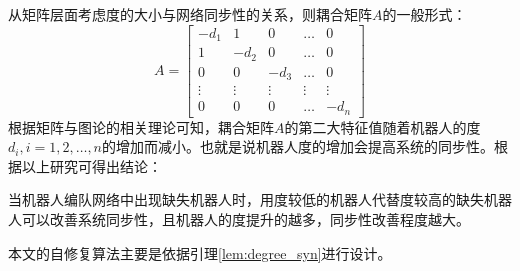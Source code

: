 从矩阵层面考虑度的大小与网络同步性的关系，则耦合矩阵$A$的一般形式：\\
\begin{equation}
	A = 
	\begin{bmatrix}
		-d_1 & 1 & 0 & \dots & 0 \\
		1 & -d_2 & 0 & \dots & 0 \\
		0 & 0 & -d_3 & \dots & 0 \\
		\vdots & \vdots & \vdots & \vdots & \vdots\\
		0 & 0 & 0 & \dots & -d_n
	\end{bmatrix}
\end{equation}
根据矩阵与图论的相关理论可知，耦合矩阵$A$的第二大特征值随着机器人的度$d_i, i=1,2,\dots,n$的增加而减小。也就是说机器人度的增加会提高系统的同步性\supercite{张飞2008移动机器人覆盖问题的研究}。根据以上研究可得出结论：\\
\begin{lem}
	\label{lem:degree_syn}
	当机器人编队网络中出现缺失机器人时，用度较低的机器人代替度较高的缺失机器人可以改善系统同步性，且机器人的度提升的越多，同步性改善程度越大。
\end{lem}

本文的自修复算法主要是依据引理\ref{lem:degree_syn}进行设计。